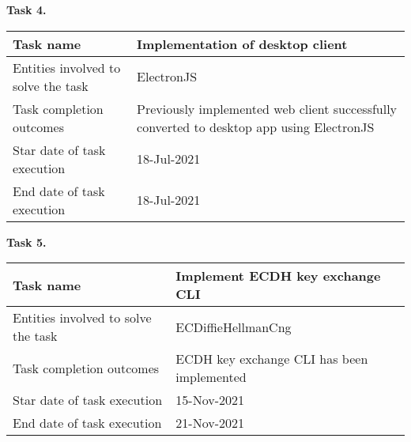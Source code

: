\vskip 5mm
\hspace*{-6mm}\textbf{Task 4.}\\
\begin{tabular}{|p{}|p{}|}
    \hline
    Task name                           & Implementation of desktop client \\
    \hline
    Entities involved to solve the task & ElectronJS                       \\
    \hline
    Task completion outcomes & Previously implemented web client successfully converted to
    desktop app using ElectronJS \\
    \hline
    Star date of task execution         & 18-Jul-2021                      \\
    \hline
    End date of task execution          & 18-Jul-2021                      \\
    \hline
\end{tabular}
\vskip 5mm
\hspace*{-6mm}\textbf{Task 5.}\\
\begin{tabular}{|p{}|p{}|}
    \hline
    Task name                           & Implement ECDH key exchange CLI            \\
    \hline
    Entities involved to solve the task & ECDiffieHellmanCng                         \\
    \hline
    Task completion outcomes            & ECDH key exchange CLI has been implemented \\
    \hline
    Star date of task execution         & 15-Nov-2021                                \\
    \hline
    End date of task execution          & 21-Nov-2021                                \\
    \hline
\end{tabular}